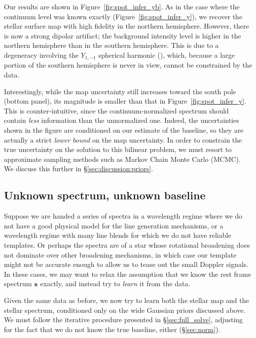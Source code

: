 \documentclass[modern]{aastex631}
\begin{document}
Our results are shown in Figure~\ref{fig:spot_infer_yb}.
As in the case where the continuum level was known exactly (Figure~\ref{fig:spot_infer_y}), we recover the stellar surface map with high fidelity in the northern hemisphere.
However, there is now a strong dipolar artifact; the background intensity level is higher in the northern hemisphere than in the southern hemisphere.
This is due to a degeneracy involving the $Y_{1,-1}$ spherical harmonic (), which, because a large portion of the southern hemisphere is never in view, cannot be constrained by the data.

Interestingly, while the map uncertainty still increases toward the south pole (bottom panel), its magnitude is smaller than that in Figure~\ref{fig:spot_infer_y}.
This is counter-intuitive, since the continuum-normalized spectrum should contain \emph{less} information than the unnormalized one.
Indeed, the uncertainties shown in the figure are conditioned on our estimate of the baseline, so they are actually a strict \emph{lower bound} on the map uncertainty.
In order to constrain the true uncertainty on the solution to this bilinear problem, we must resort to approximate sampling methods such as Markov Chain Monte Carlo (MCMC). 
We discuss this further in \S\ref{sec:discussion:priors}.

\subsection{Unknown spectrum, unknown baseline}
\label{sec:spot_y1bs}
%
Suppose we are handed a series of spectra in a wavelength regime where we do not have a good physical model for the line generation mechanisms, or a wavelength regime with many line blends for which we do not have reliable templates. 
Or perhaps the spectra are of a star whose rotational broadening does not dominate over other broadening mechanisms, in which case our template might not be accurate enough to allow us to tease out the small Doppler signals. 
In these cases, we may want to relax the assumption that we know the rest frame spectrum ${\mathbf{s}}$ exactly, and instead try to \emph{learn} it from the data.

Given the same data as before, we now try to learn both the stellar map and the stellar spectrum, conditioned only on the wide Gaussian priors discussed above. 
We must follow the iterative procedure presented in
\S\ref{sec:full_solve}, adjusting for the fact that we do not know the true baseline, either (\S\ref{sec:norm}).
\end{document}
